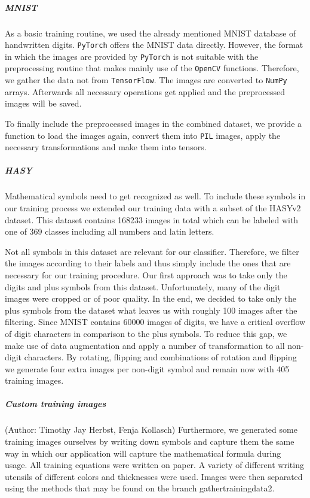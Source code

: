 \documentclass[12pt]{article}
\begin{document}
		\subparagraph{MNIST}
			As a basic training routine, we used the already mentioned MNIST database of handwritten digits. \texttt{PyTorch} offers the MNIST data directly. However, the format in which the images are provided by \texttt{PyTorch} is not suitable with the preprocessing routine that makes mainly use of the \texttt{OpenCV} functions. Therefore, we gather the data not from \texttt{TensorFlow}. The images are converted to \texttt{NumPy} arrays. Afterwards all necessary operations get applied and the preprocessed images will be saved. 
			
			To finally include the preprocessed images in the combined dataset, we provide a function to load the images again, convert them into \texttt{PIL} images, apply the necessary transformations and make them into tensors.
			
		\subparagraph{HASY}
			Mathematical symbols need to get recognized as well. To include these symbols in our training process we extended our training data with a subset of the HASYv2\cite{hasy} dataset. This dataset contains 168233 images in total which can be labeled with one of 369 classes including all numbers and latin letters. 
			
			Not all symbols in this dataset are relevant for our classifier. Therefore, we filter the images according to their labels and thus simply include the ones that are necessary for our training procedure. Our first approach was to take only the digits and plus symbols from this dataset. Unfortunately, many of the digit images were cropped or of poor quality. In the end, we decided to take only the plus symbols from the dataset what leaves us with roughly 100 images after the filtering. Since MNIST contains 60000 images of digits, we have a critical overflow of digit characters in comparison to the plus symbols. To reduce this gap, we make use of data augmentation and apply a number of transformation to all non-digit characters. By rotating, flipping and combinations of rotation and flipping we generate four extra images per non-digit symbol and remain now with 405 training images.
			
		\subparagraph{Custom training images}	\small{(Author: Timothy Jay Herbst, Fenja Kollasch)}
		Furthermore, we generated some training images ourselves by writing down symbols and capture them the same way in which our application will capture the mathematical formula during usage.
		All training equations were written on paper.
		A variety of different writing utensils of different colors and thicknesses were used.
		Images were then separated using the methods that may be found on the branch gathertrainingdata2. %
		
\end{document}
